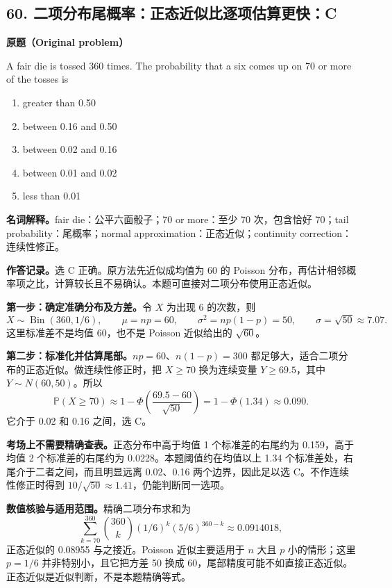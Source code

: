 \documentclass[11pt,a4paper,fontset=fandol]{ctexart}
\begin{document}
\subsection{60. 二项分布尾概率：正态近似比逐项估算更快：C}
\label{p4:q60}
\textbf{原题（Original problem）}

A fair die is tossed 360 times. The probability that a six comes up on 70 or more of the tosses is
\begin{enumerate}[label=(\Alph*)]
\item greater than 0.50
\item between 0.16 and 0.50
\item between 0.02 and 0.16
\item between 0.01 and 0.02
\item less than 0.01
\end{enumerate}
\textbf{名词解释。}fair die：公平六面骰子；70 or more：至少 70 次，包含恰好 70；tail probability：尾概率；normal approximation：正态近似；continuity correction：连续性修正。

\textbf{作答记录。}选 C 正确。原方法先近似成均值为 60 的 Poisson 分布，再估计相邻概率项之比，计算较长且不易确认。本题可直接对二项分布使用正态近似。

\textbf{第一步：确定准确分布及方差。}令 $X$ 为出现 6 的次数，则
\[
X\sim\operatorname{Bin}(360,1/6),\qquad
\mu=np=60,\qquad \sigma^2=np(1-p)=50,
\qquad \sigma=\sqrt{50}\approx7.07.
\]
这里标准差不是均值 60，也不是 Poisson 近似给出的 $\sqrt{60}$。

\textbf{第二步：标准化并估算尾部。}$np=60$、$n(1-p)=300$ 都足够大，适合二项分布的正态近似。做连续性修正时，把 $X\ge70$ 换为连续变量 $Y\ge69.5$，其中 $Y\sim N(60,50)$。所以
\begin{equation}
\mathbb P(X\ge70)
\approx1-\Phi\!\left(\frac{69.5-60}{\sqrt{50}}\right)
=1-\Phi(1.34)\approx0.090.
\label{p4:binomial-normal}
\end{equation}
它介于 0.02 和 0.16 之间，选 C。

\textbf{考场上不需要精确查表。}正态分布中高于均值 1 个标准差的右尾约为 0.159，高于均值 2 个标准差的右尾约为 0.0228。本题阈值约在均值以上 1.34 个标准差处，右尾介于二者之间，而且明显远离 0.02、0.16 两个边界，因此足以选 C。不作连续性修正时得到 $10/\sqrt{50}\approx1.41$，仍能判断同一选项。

\textbf{数值核验与适用范围。}精确二项分布求和为
\[
\sum_{k=70}^{360}\binom{360}{k}(1/6)^k(5/6)^{360-k}
\approx0.0914018,
\]
正态近似的 0.08955 与之接近。Poisson 近似主要适用于 $n$ 大且 $p$ 小的情形；这里 $p=1/6$ 并非特别小，且它把方差 50 换成 60，尾部精度可能不如直接正态近似。正态近似是近似判断，不是本题精确等式。
\end{document}
